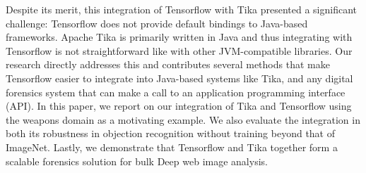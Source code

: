 Despite its merit, this integration of Tensorflow with Tika presented a significant challenge: Tensorflow does not provide default bindings to Java-based frameworks. Apache Tika is primarily written in Java and thus integrating with Tensorflow is not straightforward like with other JVM-compatible libraries. Our research directly addresses this and contributes several methods that make Tensorflow easier to integrate into Java-based systems like Tika, and any digital forensics system that can make a call to an application programming interface (API). In this paper, we report on our integration of Tika and Tensorflow using the weapons domain as a motivating example. We also evaluate the integration in both its robustness in objection recognition without training beyond that of ImageNet. Lastly, we demonstrate that Tensorflow and Tika together form  a scalable forensics solution for bulk Deep web image analysis.

